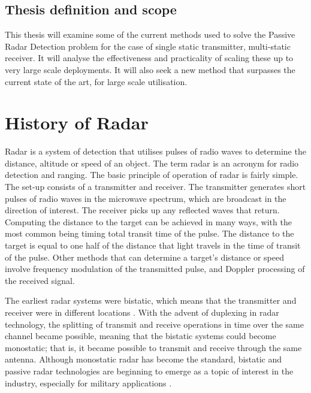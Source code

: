 \documentclass[12pt,openany,a4paper]{book}
\begin{document}
\section{Thesis definition and scope}
This thesis will examine some of the current methods used to solve the Passive Radar Detection problem for the case of single static transmitter, multi-static receiver. It will analyse the effectiveness and practicality of scaling these up to very large scale deployments. It will also seek a new method that surpasses the current state of the art, for large scale utilisation.


\cleardoublepage

\chapter{History of Radar}

Radar is a system of detection that utilises pulses of radio waves to determine the distance, altitude or speed of an object. The term radar is an acronym for radio detection and ranging. The basic principle of operation of radar is fairly simple. The set-up consists of a transmitter and receiver. The transmitter generates short pulses of radio waves in the microwave spectrum, which are broadcast in the direction of interest. The receiver picks up any reflected waves that return. Computing the distance to the target can be achieved in many ways, with the most common being timing total transit time of the pulse. The distance to the target is equal to one half of the distance that light travels in the time of transit of the pulse. Other methods that can determine a target's distance or speed involve frequency modulation of the transmitted pulse, and Doppler processing of the received signal.

\bigskip

The earliest radar systems were bistatic, which means that the transmitter and receiver were in different locations \cite{Willis}. With the advent of duplexing in radar technology, the splitting of transmit and receive operations in time over the same channel became possible, meaning that the bistatic systems could become monostatic; that is, it became possible to transmit and receive through the same antenna. Although monostatic radar has become the standard, bistatic and passive radar technologies are beginning to emerge as a topic of interest in the industry, especially for military applications \cite{Arend}. 

\bigskip
\end{document}
